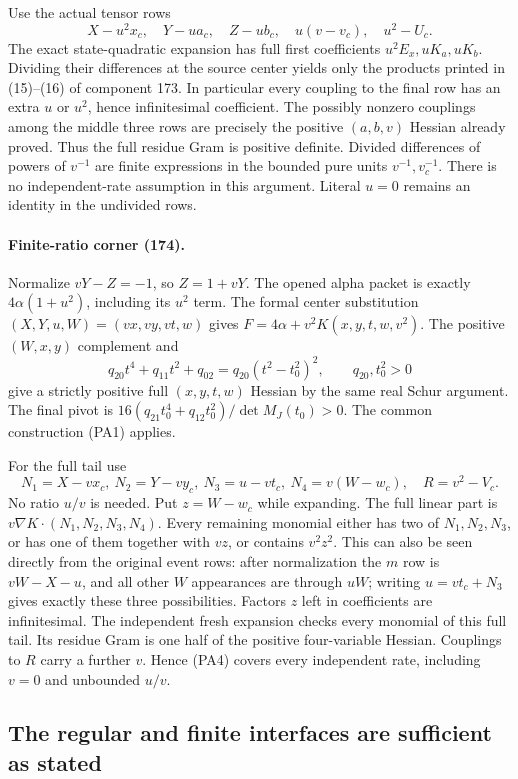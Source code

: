 Use the actual tensor rows
\[
 X-u^2x_c,\quad Y-ua_c,\quad Z-ub_c,
 \quad u(v-v_c),\quad u^2-U_c.                       \tag{PA3}
\]
The exact state-quadratic expansion has full first coefficients
$u^2E_x,uK_a,uK_b$.  Dividing their differences at the source
center yields only the products printed in (15)--(16) of component
173.  In particular every coupling to the final row has an extra
$u$ or $u^2$, hence infinitesimal coefficient.  The possibly nonzero
couplings among the middle three rows are precisely the positive
$(a,b,v)$ Hessian already proved.  Thus the full residue Gram is
positive definite.  Divided differences of powers of $v^{-1}$ are
finite expressions in the bounded pure units $v^{-1},v_c^{-1}$.
There is no independent-rate assumption in this argument.  Literal
$u=0$ remains an identity in the undivided rows.

\paragraph{Finite-ratio corner (174).}
Normalize $vY-Z=-1$, so $Z=1+vY$.  The opened alpha packet is
exactly $4\alpha(1+u^2)$, including its $u^2$ term.  The formal
center substitution $(X,Y,u,W)=(vx,vy,vt,w)$ gives
$F=4\alpha+v^2K(x,y,t,w,v^2)$.
The positive $(W,x,y)$ complement and
\[
 q_{20}t^4+q_{11}t^2+q_{02}
       =q_{20}(t^2-t_0^2)^2,\qquad q_{20},t_0^2>0
\]
give a strictly positive full $(x,y,t,w)$ Hessian by the same
real Schur argument.  The final pivot is
$16(q_{21}t_0^4+q_{12}t_0^2)/\det M_J(t_0)>0$.
The common construction (PA1) applies.

For the full tail use
\[
 N_1=X-vx_c,\ N_2=Y-vy_c,\ N_3=u-vt_c,
 \ N_4=v(W-w_c),\quad R=v^2-V_c.                   \tag{PA4}
\]
No ratio $u/v$ is needed.  Put $z=W-w_c$ while expanding.  The
full linear part is $v\nabla K\cdot(N_1,N_2,N_3,N_4)$.
Every remaining monomial either has two of $N_1,N_2,N_3$, or has
one of them together with $vz$, or contains $v^2z^2$.
This can also be seen directly from the original event rows:
after normalization the $m$ row is $vW-X-u$, and all other
$W$ appearances are through $uW$; writing $u=vt_c+N_3$ gives
exactly these three possibilities.  Factors $z$ left in
coefficients are infinitesimal.  The independent fresh expansion
checks every monomial of this full tail.  Its residue Gram is
one half of the positive four-variable Hessian.  Couplings to $R$
carry a further $v$.  Hence (PA4) covers every independent rate,
including $v=0$ and unbounded $u/v$.

\subsection{The regular and finite interfaces are sufficient as stated}

